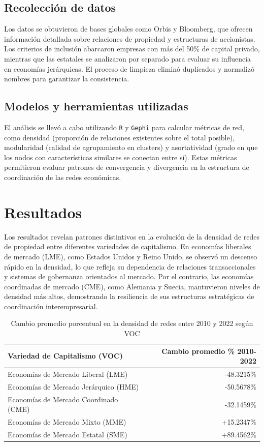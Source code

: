 \documentclass[12pt]{article}
\begin{document}
\lipsum


\subsection{Recolección de datos}
Los datos se obtuvieron de bases globales como Orbis y Bloomberg, que ofrecen información detallada sobre relaciones de propiedad y estructuras de accionistas. Los criterios de inclusión abarcaron empresas con más del 50\% de capital privado, mientras que las estatales se analizaron por separado para evaluar su influencia en economías jerárquicas. El proceso de limpieza eliminó duplicados y normalizó nombres para garantizar la consistencia.
\lipsum


\subsection{Modelos y herramientas utilizadas}
El análisis se llevó a cabo utilizando \texttt{R} y \texttt{Gephi} para calcular métricas de red, como densidad (proporción de relaciones existentes sobre el total posible), modularidad (calidad de agrupamiento en clusters) y asortatividad (grado en que los nodos con características similares se conectan entre sí). Estas métricas permitieron evaluar patrones de convergencia y divergencia en la estructura de coordinación de las redes económicas.
\lipsum

\section{Resultados}
Los resultados revelan patrones distintivos en la evolución de la densidad de redes de propiedad entre diferentes variedades de capitalismo. En economías liberales de mercado (LME), como Estados Unidos y Reino Unido, se observó un descenso rápido en la densidad, lo que refleja su dependencia de relaciones transaccionales y sistemas de gobernanza orientados al mercado. Por el contrario, las economías coordinadas de mercado (CME), como Alemania y Suecia, mantuvieron niveles de densidad más altos, demostrando la resiliencia de sus estructuras estratégicas de coordinación interempresarial.

\begin{table}[h!]
\centering
\begin{tabular}{l | r}
\hline
\hline
Variedad de Capitalismo (VOC) & Cambio promedio \% 2010-2022 \\
\hline
Economías de Mercado Liberal (LME)      & -48.3215\% \\
Economías de Mercado Jerárquico (HME)   & -50.5678\% \\
Economías de Mercado Coordinado (CME)  & -32.1459\% \\
Economías de Mercado Mixto (MME)        &  +15.2347\% \\
Economías de Mercado Estatal (SME)      &  +89.4562\% \\
\hline
\hline
\end{tabular}
\caption{Cambio promedio porcentual en la densidad de redes entre 2010 y 2022 según VOC}
\label{tab:Densities}
\end{table}
\end{document}
